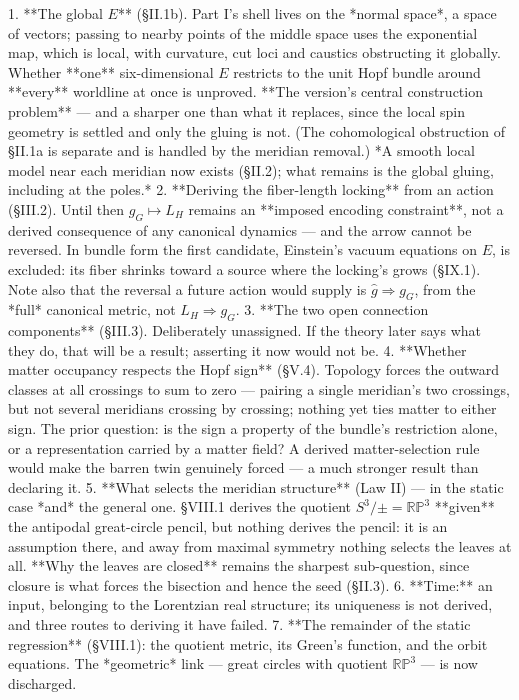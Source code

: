 1. **The global $E$** (§II.1b). Part I's shell lives on the *normal space*, a space of vectors; passing to nearby points of the middle space uses the exponential map, which is local, with curvature, cut loci and caustics obstructing it globally. Whether **one** six-dimensional $E$ restricts to the unit Hopf bundle around **every** worldline at once is unproved. **The version's central construction problem** — and a sharper one than what it replaces, since the local spin geometry is settled and only the gluing is not. (The cohomological obstruction of §II.1a is separate and is handled by the meridian removal.) *A smooth local model near each meridian now exists (§II.2); what remains is the global gluing, including at the poles.*
2. **Deriving the fiber-length locking** from an action (§III.2). Until then $g_G\mapsto L_H$ remains an **imposed encoding constraint**, not a derived consequence of any canonical dynamics — and the arrow cannot be reversed. In bundle form the first candidate, Einstein's vacuum equations on $E$, is excluded: its fiber shrinks toward a source where the locking's grows (§IX.1). Note also that the reversal a future action would supply is $\hat g\Rightarrow g_G$, from the *full* canonical metric, not $L_H\Rightarrow g_G$.
3. **The two open connection components** (§III.3). Deliberately unassigned. If the theory later says what they do, that will be a result; asserting it now would not be.
4. **Whether matter occupancy respects the Hopf sign** (§V.4). Topology forces the outward classes at all crossings to sum to zero — pairing a single meridian's two crossings, but not several meridians crossing by crossing; nothing yet ties matter to either sign. The prior question: is the sign a property of the bundle's restriction alone, or a representation carried by a matter field? A derived matter-selection rule would make the barren twin genuinely forced — a much stronger result than declaring it.
5. **What selects the meridian structure** (Law II) — in the static case *and* the general one. §VIII.1 derives the quotient $S^3/\pm = \mathbb{RP}^3$ **given** the antipodal great-circle pencil, but nothing derives the pencil: it is an assumption there, and away from maximal symmetry nothing selects the leaves at all. **Why the leaves are closed** remains the sharpest sub-question, since closure is what forces the bisection and hence the seed (§II.3).
6. **Time:** an input, belonging to the Lorentzian real structure; its uniqueness is not derived, and three routes to deriving it have failed.
7. **The remainder of the static regression** (§VIII.1): the quotient metric, its Green's function, and the orbit equations. The *geometric* link — great circles with quotient $\mathbb{RP}^3$ — is now discharged.
